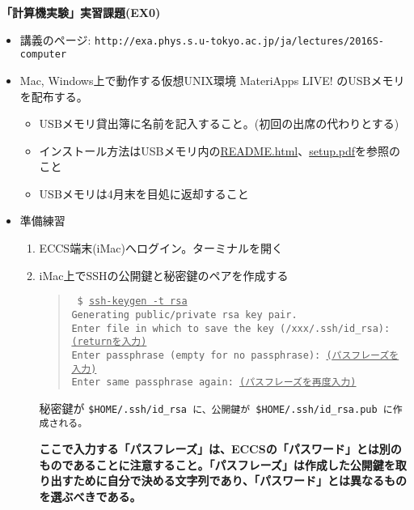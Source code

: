 \documentclass[11pt]{jarticle}
\begin{document}
\noindent
{\bf\large 「計算機実験」実習課題(EX0)}
\\[-0.5em]

\noindent
\begin{itemize}
\item 講義のページ: \verb+http://exa.phys.s.u-tokyo.ac.jp/ja/lectures/2016S-computer+
\item Mac, Windows上で動作する仮想UNIX環境 MateriApps LIVE! のUSBメモリを配布する。
  \begin{itemize}
  \item USBメモリ貸出簿に名前を記入すること。(初回の出席の代わりとする)
  \item インストール方法はUSBメモリ内の\href{https://github.com/cmsi/MateriAppsLive/wiki/MateriAppsLive-ltx}{README.html}、\href{https://github.com/cmsi/MateriAppsLive-setup/blob/master/ova/setup.pdf}{setup.pdf}を参照のこと
  \item USBメモリは4月末を目処に返却すること
  \end{itemize}

\item 準備練習
  \begin{enumerate}
  \item ECCS端末(iMac)へログイン。ターミナルを開く
  \item iMac上でSSHの公開鍵と秘密鍵のペアを作成する
    \begin{quote} \tt
      \$ \underline{ssh-keygen -t rsa} \\
      Generating public/private rsa key pair.\\
      Enter file in which to save the key (/xxx/.ssh/id\_rsa): \underline{(returnを入力)}\\
      Enter passphrase (empty for no passphrase): \underline{(パスフレーズを入力)}\\
      Enter same passphrase again: \underline{(パスフレーズを再度入力)}
    \end{quote}
    秘密鍵が \tt{\$HOME/.ssh/id\_rsa} に、公開鍵が \tt{\$HOME/.ssh/id\_rsa.pub} に作成される。
    
    {\bf ここで入力する「パスフレーズ」は、ECCSの「パスワード」とは別のものであることに注意すること。「パスフレーズ」は作成した公開鍵を取り出すために自分で決める文字列であり、「パスワード」とは異なるものを選ぶべきである。}


\end{enumerate}
\end{itemize}
\end{document}
